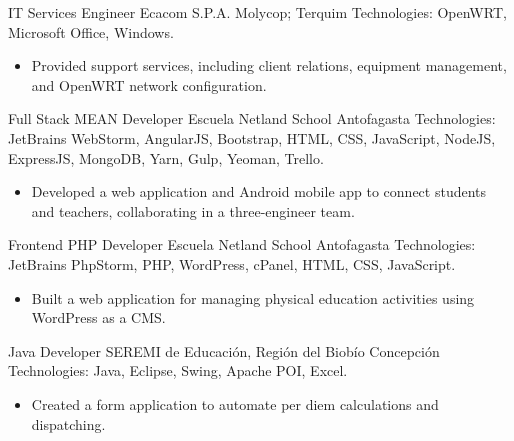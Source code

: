 \documentclass[12pt,letterpaper,sans]{moderncv}
\begin{document}
{IT Services Engineer}
{Ecacom S.P.A.}
{\newline Molycop; Terquim}
{\newline Technologies: OpenWRT, Microsoft Office, Windows.}
{
  \begin{itemize}
    \item Provided support services, including client relations, equipment management, and OpenWRT network configuration.
  \end{itemize}
}
\vspace{0.5em}

{Full Stack MEAN Developer}
{Escuela Netland School}
{\newline Antofagasta}
{\newline Technologies: JetBrains WebStorm, AngularJS, Bootstrap, HTML, CSS, JavaScript, NodeJS, ExpressJS, MongoDB, Yarn, Gulp, Yeoman, Trello.}
{
  \begin{itemize}
    \item Developed a web application and Android mobile app to connect students and teachers, collaborating in a three-engineer team.
  \end{itemize}
}
\vspace{0.5em}

{Frontend PHP Developer}
{Escuela Netland School}
{\newline Antofagasta}
{\newline Technologies: JetBrains PhpStorm, PHP, WordPress, cPanel, HTML, CSS, JavaScript.}
{
  \begin{itemize}
    \item Built a web application for managing physical education activities using WordPress as a CMS.
  \end{itemize}
}
\vspace{0.5em}

{Java Developer}
{SEREMI de Educación, Región del Biobío}
{\newline Concepción}
{\newline Technologies: Java, Eclipse, Swing, Apache POI, Excel.}
{
  \begin{itemize}
    \item Created a form application to automate per diem calculations and dispatching.
  \end{itemize}
}
\vspace{0.5em}

\newpage
\end{document}
